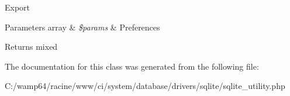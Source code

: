 Export


\begin{DoxyParams}[1]{Parameters}
array & {\em \$params} & Preferences \\
\hline
\end{DoxyParams}
\begin{DoxyReturn}{Returns}
mixed 
\end{DoxyReturn}


The documentation for this class was generated from the following file\+:\begin{DoxyCompactItemize}
\item 
C\+:/wamp64/racine/www/ci/system/database/drivers/sqlite/sqlite\+\_\+utility.\+php\end{DoxyCompactItemize}
